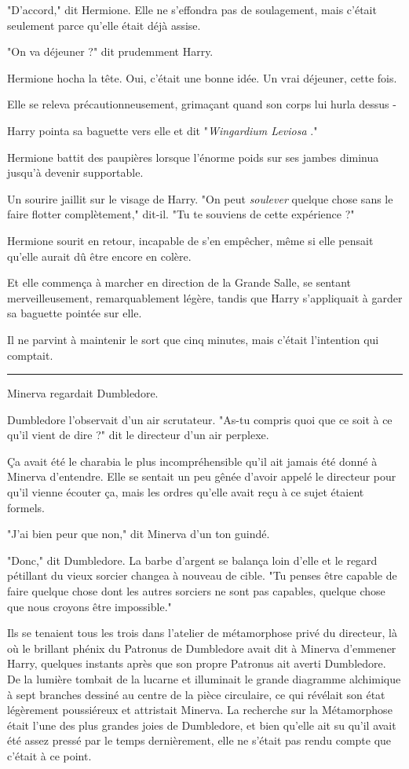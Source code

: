 "D'accord," dit Hermione. Elle ne s'effondra pas de soulagement, mais c'était seulement parce qu'elle était déjà assise.

"On va déjeuner ?" dit prudemment Harry.

Hermione hocha la tête. Oui, c'était une bonne idée. Un vrai déjeuner, cette fois.

Elle se releva précautionneusement, grimaçant quand son corps lui hurla dessus -

Harry pointa sa baguette vers elle et dit "\emph{Wingardium Leviosa} ."

Hermione battit des paupières lorsque l'énorme poids sur ses jambes diminua jusqu'à devenir supportable.

Un sourire jaillit sur le visage de Harry. "On peut \emph{soulever}  quelque chose sans le faire flotter complètement," dit-il. "Tu te souviens de cette expérience ?"

Hermione sourit en retour, incapable de s'en empêcher, même si elle pensait qu'elle aurait dû être encore en colère.

Et elle commença à marcher en direction de la Grande Salle, se sentant merveilleusement, remarquablement légère, tandis que Harry s'appliquait à garder sa baguette pointée sur elle.

Il ne parvint à maintenir le sort que cinq minutes, mais c'était l'intention qui comptait.
\par\noindent\rule{\textwidth}{0.4pt}
Minerva regardait Dumbledore.

Dumbledore l'observait d'un air scrutateur. "As-tu compris quoi que ce soit à ce qu'il vient de dire ?" dit le directeur d'un air perplexe.

Ça avait été le charabia le plus incompréhensible qu'il ait jamais été donné à Minerva d'entendre. Elle se sentait un peu gênée d'avoir appelé le directeur pour qu'il vienne écouter ça, mais les ordres qu'elle avait reçu à ce sujet étaient formels.

"J'ai bien peur que non," dit Minerva d'un ton guindé.

"Donc," dit Dumbledore. La barbe d'argent se balança loin d'elle et le regard pétillant du vieux sorcier changea à nouveau de cible. "Tu penses être capable de faire quelque chose dont les autres sorciers ne sont pas capables, quelque chose que nous croyons être impossible."

Ils se tenaient tous les trois dans l'atelier de métamorphose privé du directeur, là où le brillant phénix du Patronus de Dumbledore avait dit à Minerva d'emmener Harry, quelques instants après que son propre Patronus ait averti Dumbledore. De la lumière tombait de la lucarne et illuminait le grande diagramme alchimique à sept branches dessiné au centre de la pièce circulaire, ce qui révélait son état légèrement poussiéreux et attristait Minerva. La recherche sur la Métamorphose était l'une des plus grandes joies de Dumbledore, et bien qu'elle ait su qu'il avait été assez pressé par le temps dernièrement, elle ne s'était pas rendu compte que c'était à ce point.

